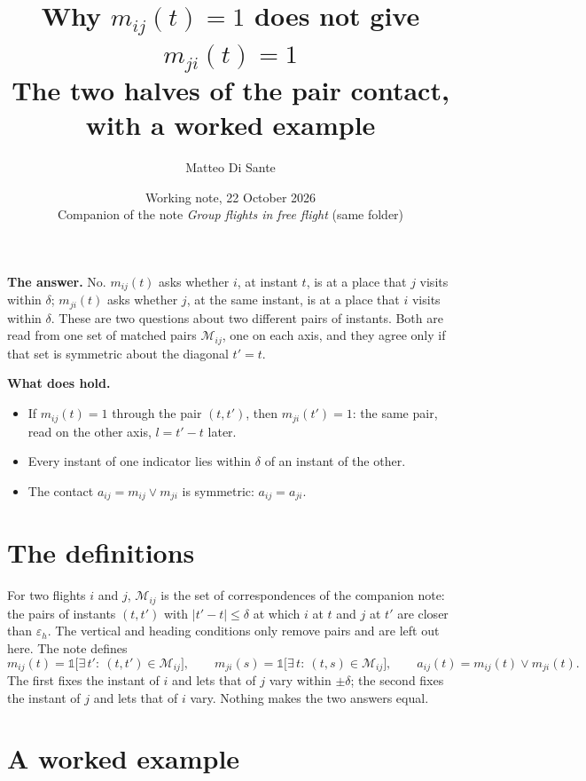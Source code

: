 \documentclass[11pt,a4paper]{article}
\title{\textbf{Why \texorpdfstring{$m_{ij}(t)=1$ does not give $m_{ji}(t)=1$}{m\_ij(t)=1 does not give m\_ji(t)=1}}\\[4pt]
  \large The two halves of the pair contact, with a worked example}
\author{Matteo Di Sante}
\date{Working note, 22 October 2026\\[2pt]
  \small Companion of the note \emph{Group flights in free flight} (same folder)}
\newcommand{\M}{\mathcal{M}}
\newcommand{\ind}{\mathbb{1}}
\begin{document}
\maketitle

\begin{summary}
\textbf{The answer.} No. $m_{ij}(t)$ asks whether $i$, at instant $t$, is at a place that $j$
visits within $\delta$; $m_{ji}(t)$ asks whether $j$, at the same instant, is at a place that
$i$ visits within $\delta$. These are two questions about two different pairs of instants.
Both are read from one set of matched pairs $\M_{ij}$, one on each axis, and they agree only
if that set is symmetric about the diagonal $t'=t$.

\textbf{What does hold.}
\begin{itemize}
  \item If $m_{ij}(t)=1$ through the pair $(t,t')$, then $m_{ji}(t')=1$: the same pair, read on
        the other axis, $l=t'-t$ later.
  \item Every instant of one indicator lies within $\delta$ of an instant of the other.
  \item The contact $a_{ij}=m_{ij}\vee m_{ji}$ is symmetric: $a_{ij}=a_{ji}$.
\end{itemize}
\end{summary}

\section{The definitions}

For two flights $i$ and $j$, $\M_{ij}$ is the set of correspondences of the companion note: the
pairs of instants $(t,t')$ with $|t'-t|\le\delta$ at which $i$ at $t$ and $j$ at $t'$ are closer
than $\varepsilon_h$. The vertical and heading conditions only remove pairs and are left out
here. The note defines
\begin{equation*}
  m_{ij}(t)=\ind\bigl[\exists\,t':\ (t,t')\in\M_{ij}\bigr],\qquad
  m_{ji}(s)=\ind\bigl[\exists\,t:\ (t,s)\in\M_{ij}\bigr],\qquad
  a_{ij}(t)=m_{ij}(t)\vee m_{ji}(t).
\end{equation*}
The first fixes the instant of $i$ and lets that of $j$ vary within $\pm\delta$; the second fixes
the instant of $j$ and lets that of $i$ vary. Nothing makes the two answers equal.

\section{A worked example}
\end{document}
